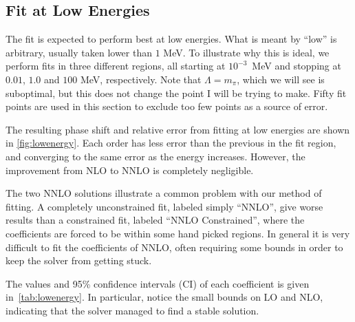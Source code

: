 \newcommand{\eend}{E_{\text{end}}}
\subsection{Fit at Low Energies}
The fit is expected to perform best at low energies. What is meant by ``low'' is
arbitrary, usually taken lower than \(1\) MeV. To illustrate why this is ideal,
we perform fits in three different regions, all starting at \mbox{\(10^{-3}\) MeV}
and stopping at \(0.01\), \(1.0\) and \(100\) MeV, respectively. Note that
\(\Lambda=m_{\pi}\), which we will see is suboptimal, but this does not change the
point I will be trying to make. Fifty fit points are used in this section to
exclude too few points as a source of error.

The resulting phase shift and relative error from fitting at low energies are shown in
\cref{fig:lowenergy}. Each order has less
error than the previous in the fit region, and converging to the same error as the
energy increases. However, the improvement from NLO to NNLO is completely
negligible. 

The two NNLO solutions illustrate a common problem with our method
of fitting. A completely unconstrained fit, labeled simply ``NNLO'', give worse
results than a constrained fit, labeled ``NNLO Constrained'', where the
coefficients are forced to be within some hand
picked regions. In general it is very difficult to fit the coefficients of NNLO,
often requiring some bounds in order to keep the solver from getting stuck.

The values and  95\% confidence intervals (CI) of each coefficient is given
in~\cref{tab:lowenergy}. In particular, notice the small bounds on LO and NLO,
indicating that the solver managed to find a stable solution.


